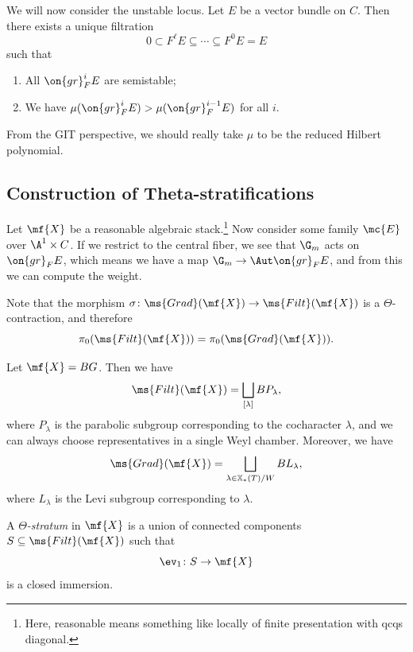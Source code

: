We will now consider the unstable locus. Let \(E\) be a vector bundle on \(C\). Then there exists a unique filtration
\[ 0 \subset F^{\ell} E \subseteq \cdots \subseteq F^0 E = E \]
such that
\begin{enumerate}
    \item All \(\on{gr}_F^i E\) are semistable;
    \item We have \(\mu(\on{gr}_F^i E) > \mu(\on{gr}_F^{i-1} E)\) for all \(i\). 
\end{enumerate}
\begin{rmk}
    From the GIT perspective, we should really take \(\mu\) to be the reduced Hilbert polynomial.
\end{rmk}

\subsection{Construction of Theta-stratifications}%
\label{sub:Construction of Theta-stratifications}

Let \(\mf{X}\) be a reasonable algebraic stack.\footnote{Here, reasonable means something like locally of finite presentation with qcqs diagonal.} Now consider some family \(\mc{E}\) over \(\A^1 \times C\). If we restrict to the central fiber, we see that \(\G_m\) acts on \(\on{gr}_F E\), which means we have a map \(\G_m \to \Aut \on{gr}_F E\), and from this we can compute the weight. 

Note that the morphism \(\sigma \colon \ms{Grad}(\mf{X}) \to \ms{Filt}(\mf{X})\) is a \(\Theta\)-contraction, and therefore
\[ \pi_0(\ms{Filt}(\mf{X})) = \pi_0(\ms{Grad}(\mf{X})). \]

\begin{exm}
    Let \(\mf{X} = BG\). Then we have
    \[\ms{Filt}(\mf{X}) = \bigsqcup_{[\lambda]} B P_{\lambda}, \]
    where \(P_{\lambda}\) is the parabolic subgroup corresponding to the cocharacter \(\lambda\), and we can always choose representatives in a single Weyl chamber. Moreover, we have
    \[ \ms{Grad}(\mf{X}) = \bigsqcup_{\lambda \in \mathbb{X}_*(T)/W} B L_{\lambda}, \]
    where \(L_{\lambda}\) is the Levi subgroup corresponding to \(\lambda\).
\end{exm}

\begin{defn}
    A \textit{\(\Theta\)-stratum} in \(\mf{X}\) is a union of connected components \(S \subseteq \ms{Filt}(\mf{X})\) such that
    \[ \ev_1 \colon S \to \mf{X} \]
    is a closed immersion.
\end{defn}

